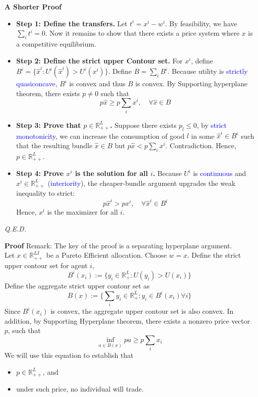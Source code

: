 \noindent \textbf{A Shorter Proof} 
\begin{itemize}
    \item \textbf{Step 1: Define the transfers.} Let $t^i = x^i - w^i$. By feasibility, we have $\sum_i t^i = 0$. Now it remains to show that 
        there exists a price system where $x$ is a competitive equilibrium.
    \item \textbf{Step 2: Define the strict upper Contour set.} 
        For $x^i$, define $B^i = \{\hat{x}^i: U^i(\hat{x}^i) > U^i(x^i) \}$. 
        Define $B = \sum_i B^i$.
        Because utility is \textcolor{blue}{strictly quasiconcave}, $B^i$ is convex and thus $B$ is convex.
        By Supporting hyperplane theorem, there exists $p \neq 0$ such that 
        \[
        p \hat{x} \geq p \sum_i x^i, \quad \forall \hat{x} \in B
        \]
    \item \textbf{Step 3: Prove that $p \in \mathbb{R}_{++}^L$.} 
        Suppose there exists $p_l \leq 0$, by \textcolor{blue}{strict monotonicity}, we can increase the consumption of good $l$ in some $\hat{x}^i \in B^i$ such that 
        the resulting bundle $\hat{x} \in B$ but $p \hat{x} < p \sum_i x^i$. Contradiction. Hence, $p \in \mathbb{R}_{++}^L$.
    \item \textbf{Step 4: Prove $x^i$ is the solution for all $i$.}
        Because $U^i$ is \textcolor{blue}{continuous} and $x^i \in \mathbb{R}_{++}^L$ (\textcolor{blue}{interiority}), the cheaper-bundle argument upgrades the weak inequality to strict:
        \[
        p \hat{x}^i > p x^i, \quad \forall \hat{x}^i \in B^i
        \]
        Hence, $x^i$ is the maximizer for all $i$.  
\end{itemize}
\textit{Q.E.D.}



\noindent \textbf{Proof} 
Remark: The key of the proof is a separating hyperplane argument.
\\
\noindent 
Let $x \in \mathbb{R}^{LI}_{++}$ be a Pareto Efficient allocation.
Choose $w = x$.
Define the strict upper contour set for agent $i$, 
\[
B^i(x_i) := \{y_i \in \mathbb{R}^L_{+}: U(y_i) > U(x_i) \}
\]
Define the aggregate strict upper contour set as 
\[
B(x) := \bigg\{\sum_i y_i \in \mathbb{R}^L_{+}: y_i \in B^i(x_i) \forall i \bigg\}
\]
Since $B^i(x_i)$ is convex, the aggregate upper contour set is also convex. 
In addition, by Supporting Hyperplane theorem, 
there exists a nonzero price vector $p$, such that
\[
\inf_{a \in B(x)} p a \geq p \sum_i x_i
\]
We will use this equation to establish that 
\begin{itemize}
    \item[(1)] $p \in \mathbb{R}^{L}_{++}$, and 
    \item[(2)] under such price, no individual will trade.
\end{itemize}

